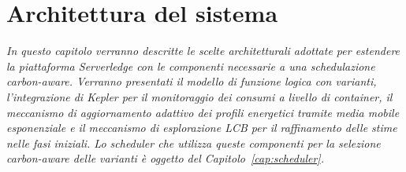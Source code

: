 \chapter{Architettura del sistema}
\label{cap:ProgettazioneRealizzazione}

\emph{In questo capitolo verranno descritte le scelte architetturali
adottate per estendere la piattaforma Serverledge con le componenti
necessarie a una schedulazione carbon-aware. Verranno presentati il
modello di funzione logica con varianti, l'integrazione di Kepler per
il monitoraggio dei consumi a livello di container, il meccanismo di
aggiornamento adattivo dei profili energetici tramite media mobile
esponenziale e il meccanismo di esplorazione LCB per il raffinamento
delle stime nelle fasi iniziali. Lo scheduler che utilizza queste
componenti per la selezione carbon-aware delle varianti è oggetto del
Capitolo~\ref{cap:scheduler}.}




